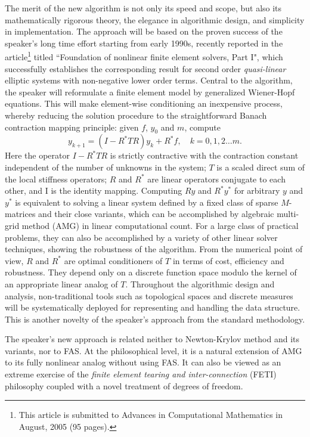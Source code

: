 \documentclass{report}
\begin{document}
The merit of the new algorithm is not only its speed and scope,
but also its mathematically rigorous theory,
the elegance in algorithmic design, and simplicity
in implementation. The approach will be
based on the proven success of the speaker's long time effort starting
from early 1990s, recently reported in the article\footnote{This article
is submitted to Advances in Computational Mathematics in August, 2005 (95
pages). } titled ``Foundation of
nonlinear finite element solvers, Part I", which successfully establishes
the corresponding result for
second order {\it quasi-linear} elliptic systems
with non-negative lower order terms.
Central to the algorithm, the speaker will reformulate a finite element
model by generalized Wiener-Hopf equations. This will
make element-wise conditioning an inexpensive process,
whereby reducing the solution procedure to the straightforward
Banach contraction mapping principle: given $f$, $y_0$ and $m$, compute
$$
y_{k+1} = (I-R^* T R) y_k+ R^*f,
\quad k=0,1,2\dots m.
$$
Here the operator $I- R^* T R$ is strictly contractive with
the contraction constant
independent of the number of unknowns in the system; $T$
is a scaled direct sum of the local stiffness operators;
$R$ and $R^*$ are linear operators conjugate to each other,
and I is the identity mapping. Computing $Ry$ and $R^* y^*$
for arbitrary $y$ and $y^*$ is equivalent to solving a linear system
defined by a fixed class of sparse $M$-matrices and their close variants,
which
can be accomplished by algebraic multi-grid method (AMG) in linear
computational count. For a large class of practical problems, they can
also be
accomplished by a variety of other linear solver techniques,
showing the robustness of
the algorithm. From the numerical point of view, $R$ and $R^*$
are optimal conditioners of $T$ in terms of cost, efficiency and
robustness. They depend only on a discrete function space modulo the
kernel of an appropriate linear analog of $T$.
Throughout the algorithmic design and analysis,
non-traditional tools such as
topological spaces and discrete measures will be systematically deployed
for representing and handling the
data structure. This is another novelty of the speaker's approach from
the standard methodology.


The speaker's new approach is related neither to Newton-Krylov method and
its variants, nor to FAS.
At the philosophical level, it is a natural extension of AMG
to its fully nonlinear analog without using FAS. It can also be viewed as
an extreme exercise
of the {\it finite element tearing and inter-connection} (FETI)
philosophy coupled with
a novel treatment of degrees of freedom.
\end{document}

